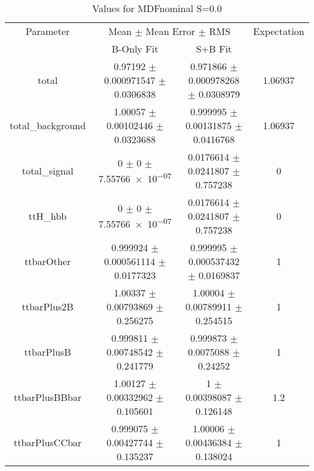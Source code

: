 \begin{table}
\centering
\caption{Values for MDFnominal S=0.0}
\begin{tabular}{cccc}
\toprule
Parameter & \multicolumn{2}{c}{Mean $\pm$ Mean Error $\pm$ RMS} & Expectation\\
 & B-Only Fit & S+B Fit & \\
\midrule
total & \num{0.97192} $\pm$ \num{0.000971547} $\pm$ \num{0.0306838} & \num{0.971866} $\pm$ \num{0.000978268} $\pm$ \num{0.0308979} & \num{1.06937}\\
total\_background & \num{1.00057} $\pm$ \num{0.00102446} $\pm$ \num{0.0323688} & \num{0.999995} $\pm$ \num{0.00131875} $\pm$ \num{0.0416768} & \num{1.06937}\\
total\_signal & \num{0} $\pm$ \num{0} $\pm$ \num{7.55766e-07} & \num{0.0176614} $\pm$ \num{0.0241807} $\pm$ \num{0.757238} & \num{0}\\
ttH\_hbb & \num{0} $\pm$ \num{0} $\pm$ \num{7.55766e-07} & \num{0.0176614} $\pm$ \num{0.0241807} $\pm$ \num{0.757238} & \num{0}\\
ttbarOther & \num{0.999924} $\pm$ \num{0.000561114} $\pm$ \num{0.0177323} & \num{0.999995} $\pm$ \num{0.000537432} $\pm$ \num{0.0169837} & \num{1}\\
ttbarPlus2B & \num{1.00337} $\pm$ \num{0.00793869} $\pm$ \num{0.256275} & \num{1.00004} $\pm$ \num{0.00789911} $\pm$ \num{0.254515} & \num{1}\\
ttbarPlusB & \num{0.999811} $\pm$ \num{0.00748542} $\pm$ \num{0.241779} & \num{0.999873} $\pm$ \num{0.0075088} $\pm$ \num{0.24252} & \num{1}\\
ttbarPlusBBbar & \num{1.00127} $\pm$ \num{0.00332962} $\pm$ \num{0.105601} & \num{1} $\pm$ \num{0.00398087} $\pm$ \num{0.126148} & \num{1.2}\\
ttbarPlusCCbar & \num{0.999075} $\pm$ \num{0.00427744} $\pm$ \num{0.135237} & \num{1.00006} $\pm$ \num{0.00436384} $\pm$ \num{0.138024} & \num{1}\\
\bottomrule
\end{tabular}
\end{table}